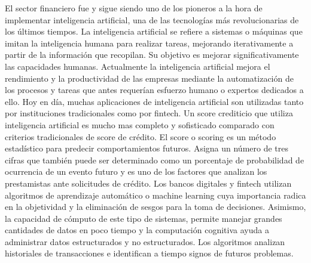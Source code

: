El sector financiero fue y sigue siendo uno de los pioneros a la hora de implementar inteligencia artificial, una de las tecnologías más revolucionarias de los últimos tiempos.
La inteligencia artificial se refiere a sistemas o máquinas que imitan la inteligencia humana para realizar tareas, mejorando iterativamente a partir de la información que recopilan. Su objetivo es mejorar significativamente las capacidades humanas. 
Actualmente  la inteligencia artificial mejora el rendimiento y la productividad de las empresas mediante la automatización de los procesos y tareas que antes requerían esfuerzo humano o expertos dedicados a ello.
Hoy en día, muchas aplicaciones de inteligencia artificial son utilizadas tanto por instituciones tradicionales como por fintech. Un score crediticio que utiliza inteligencia artificial es mucho mas completo y sofisticado comparado con criterios tradicionales de score de crédito.
El score o scoring es un método estadístico para predecir comportamientos futuros. Asigna un número de tres cifras que también puede ser determinado como un porcentaje de probabilidad de ocurrencia de un evento futuro y es uno de los factores que analizan los prestamistas ante solicitudes de crédito.  
Los bancos digitales y fintech utilizan algoritmos de aprendizaje automático o machine learning cuya importancia radica en la objetividad y la eliminación de sesgos para la toma de decisiones. Asimismo, la capacidad de cómputo de este tipo de sistemas, permite manejar grandes cantidades de datos en poco tiempo y la computación cognitiva ayuda a administrar datos estructurados y no estructurados. Los algoritmos analizan historiales de transacciones e identifican a tiempo signos de futuros problemas.






